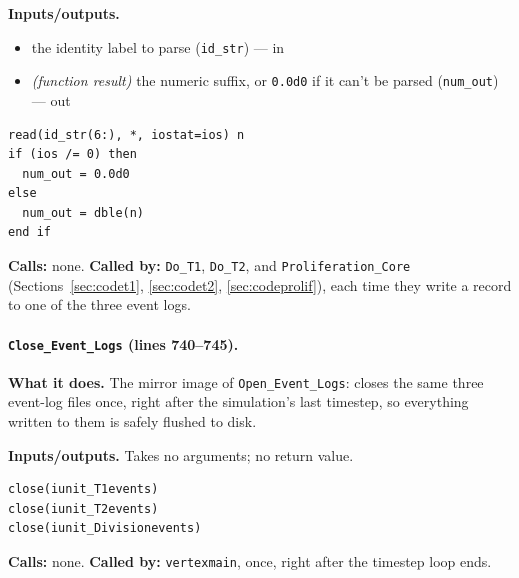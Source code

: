 \documentclass[11pt]{article}
\begin{document}
\textbf{Inputs/outputs.}
\begin{itemize}[nosep]
  \item the identity label to parse (\texttt{id\_str}) --- in
  \item \emph{(function result)} the numeric suffix, or \texttt{0.0d0} if it can't be parsed (\texttt{num\_out}) --- out
\end{itemize}

\begin{lstlisting}[caption={The complete body of the \texttt{CellIdNum} function.}]
read(id_str(6:), *, iostat=ios) n
if (ios /= 0) then
  num_out = 0.0d0
else
  num_out = dble(n)
end if
\end{lstlisting}

\textbf{Calls:} none. \textbf{Called by:} \texttt{Do\_T1}, \texttt{Do\_T2}, and
\texttt{Proliferation\_Core} (Sections~\ref{sec:codet1}, \ref{sec:codet2},
\ref{sec:codeprolif}), each time they write a record to one of the three event logs.

\paragraph{\texttt{Close\_Event\_Logs} (lines 740--745).}
\textbf{What it does.} The mirror image of \texttt{Open\_Event\_Logs}: closes the same
three event-log files once, right after the simulation's last timestep, so everything
written to them is safely flushed to disk.

\textbf{Inputs/outputs.} Takes no arguments; no return value.

\begin{lstlisting}[caption={The complete body of \texttt{Close\_Event\_Logs}.}]
close(iunit_T1events)
close(iunit_T2events)
close(iunit_Divisionevents)
\end{lstlisting}

\textbf{Calls:} none. \textbf{Called by:} \texttt{vertexmain}, once, right after the
timestep loop ends.
\end{document}
